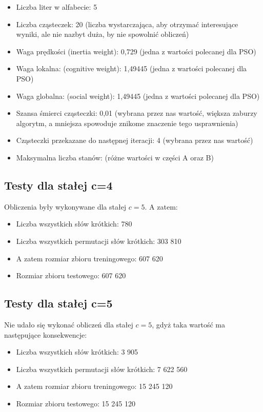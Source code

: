 \documentclass{../llncs_template_final/llncs}
\begin{document}
\begin{itemize}
\item Liczba liter w alfabecie: 5
\item Liczba cząsteczek: 20 (liczba wystarczająca, aby otrzymać interesujące wyniki, ale nie nazbyt duża, by nie spowolnić obliczeń)
\item Waga prędkości (inertia weight): 0,729 (jedna z wartości polecanej dla PSO)
\item Waga lokalna: (cognitive weight): 1,49445 (jedna z wartości polecanej dla PSO)
\item Waga globalna: (social weight): 1,49445	(jedna z wartości polecanej dla PSO)
\item Szansa śmierci cząsteczki: 0,01 (wybrana przez nas wartość, większa zaburzy algorytm, a mniejsza spowoduje znikome znaczenie tego usprawnienia)
\item Cząsteczki przekazane do następnej iteracji: 4 (wybrana przez nas wartość)
\item Maksymalna liczba stanów: (różne wartości w części A oraz B)
\end{itemize}

\subsection{Testy dla stałej c=4}
Obliczenia były wykonywane dla stałej $c = 5$. A zatem:
\begin{itemize}
\item Liczba wszystkich słów krótkich: 780
\item Liczba wszystkich permutacji słów krótkich: 303 810
\item A zatem rozmiar zbioru treningowego: 607 620
\item Rozmiar zbioru testowego: 607 620
\end{itemize}


\subsection{Testy dla stałej c=5}
Nie udało się wykonać obliczeń dla stałej $c = 5$, gdyż taka wartość ma następujące konsekwencje:
\begin{itemize}
\item Liczba wszystkich słów krótkich: 3 905
\item Liczba wszystkich permutacji słów krótkich: 7 622 560
\item A zatem rozmiar zbioru treningowego: 15 245 120
\item Rozmiar zbioru testowego: 15 245 120
\end{itemize}
\end{document}
